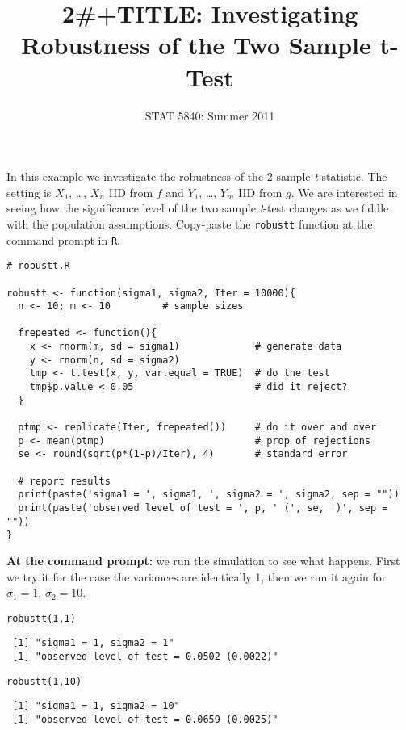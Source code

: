\documentclass[11pt,english]{article}
\title{2\#+TITLE:   Investigating Robustness of the Two Sample t-Test}
\date{STAT 5840: Summer 2011}
\begin{document}
\maketitle

\thispagestyle{empty}

In this example we investigate the robustness of the 2 sample \emph{t} statistic.  The setting is $X_{1}$, \ldots{}, $X_{n}$ IID from $f$ and $Y_{1}$, \ldots{}, $Y_{m}$ IID from $g$.  We are interested in seeing how the significance level of the two sample \emph{t}-test changes as we fiddle with the population assumptions.  Copy-paste the \texttt{robustt} function at the command prompt in \texttt{R}.
\begin{verbatim}
# robustt.R

robustt <- function(sigma1, sigma2, Iter = 10000){
  n <- 10; m <- 10         # sample sizes

  frepeated <- function(){
    x <- rnorm(m, sd = sigma1)             # generate data
    y <- rnorm(n, sd = sigma2)  
    tmp <- t.test(x, y, var.equal = TRUE)  # do the test
    tmp$p.value < 0.05                     # did it reject? 
  }

  ptmp <- replicate(Iter, frepeated())     # do it over and over
  p <- mean(ptmp)                          # prop of rejections
  se <- round(sqrt(p*(1-p)/Iter), 4)       # standard error
  
  # report results
  print(paste('sigma1 = ', sigma1, ', sigma2 = ', sigma2, sep = ""))
  print(paste('observed level of test = ', p, ' (', se, ')', sep = ""))
}
\end{verbatim}


\bigskip
\noindent

\textbf{At the command prompt:} we run the simulation to see what happens.  First we try it for the case the variances are identically 1, then we run it again for $\sigma_{1} = 1$, $\sigma_{2} = 10$.

\begin{verbatim}
robustt(1,1)
\end{verbatim}

\begin{verbatim}
 [1] "sigma1 = 1, sigma2 = 1"
 [1] "observed level of test = 0.0502 (0.0022)"
\end{verbatim}


\begin{verbatim}
robustt(1,10)
\end{verbatim}

\begin{verbatim}
 [1] "sigma1 = 1, sigma2 = 10"
 [1] "observed level of test = 0.0659 (0.0025)"
\end{verbatim}
\end{document}
